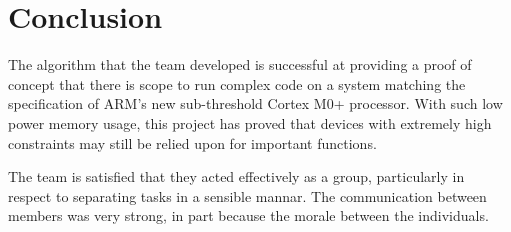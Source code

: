 \chapter{Conclusion}

The algorithm that the team developed is successful at providing a proof of concept that there is scope to run complex code on a system matching the specification of ARM's new sub-threshold Cortex M0+ processor. With such low power memory usage, this project has proved that devices with extremely high constraints may still be relied upon for important functions.

The team is satisfied that they acted effectively as a group, particularly in respect to separating tasks in a sensible mannar. The communication between members was very strong, in part because the morale between the individuals. 